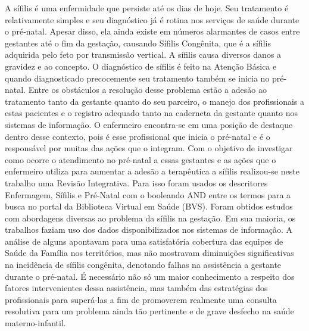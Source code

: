 A sífilis é uma enfermidade que persiste até os dias de hoje. Seu tratamento é relativamente simples e seu diagnóstico já é rotina nos serviços de saúde durante o pré-natal. Apesar disso, ela ainda existe em números alarmantes de casos entre gestantes até o fim da gestação, causando Sífilis Congênita, que é a sífilis adquirida pelo feto por transmissão vertical. A sífilis causa diversos danos a gravidez e ao concepto. O diagnóstico de sífilis é feito na Atenção Básica e quando diagnosticado precocemente seu tratamento também se inicia no pré-natal. Entre os obstáculos a resolução desse problema estão a adesão ao tratamento tanto da gestante quanto do seu parceiro, o manejo dos profissionais a estas pacientes e o registro adequado tanto na caderneta da gestante quanto nos sistemas de informação. O enfermeiro encontra-se em uma posição de destaque dentro desse contexto, pois é esse profissional que inicia o pré-natal e é o responsável por muitas das ações que o integram. Com o objetivo de investigar como ocorre o atendimento no pré-natal a essas gestantes e as ações que o enfermeiro utiliza para aumentar a adesão a terapêutica a sífilis realizou-se neste trabalho uma Revisão Integrativa. Para isso foram usados os descritores Enfermagem, Sífilis e Pré-Natal com o booleando AND entre os termos para a busca no portal da Biblioteca Virtual em Saúde (BVS). Foram obtidos estudos com abordagens diversas ao problema da sífilis na gestação. Em sua maioria, os trabalhos faziam uso dos dados disponibilizados nos sistemas de informação. A análise de alguns apontavam para uma satisfatória cobertura das equipes de Saúde da Família nos territórios, mas não mostravam diminuições significativas na incidência de sífilis congênita, denotando falhas na assistência a gestante durante o pré-natal. É necessário não só um maior conhecimento a respeito dos fatores intervenientes dessa assistência, mas também das estratégias dos profissionais para superá-las a fim de promoverem realmente uma consulta resolutiva para um problema ainda tão pertinente e de grave desfecho na saúde materno-infantil. 

